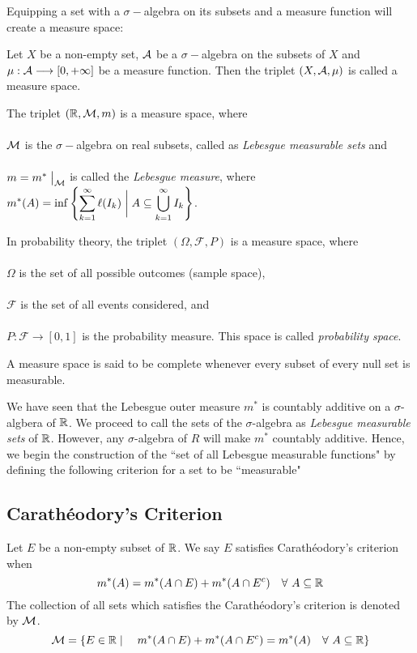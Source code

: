 \documentclass[a4paper]{book}
\begin{document}
\noindent Equipping a set with a $\sigma-$algebra on its subsets and a measure function will create a measure space:
\begin{definition}
Let $X$ be a non-empty set, $\mathcal{A}$ be a $\sigma-$algebra on the subsets of $X$ and $\mu: \mathcal{A} \longrightarrow [0, +\infty]$ be a measure function. Then the triplet $(X, \mathcal{A}, \mu)$ is called a measure space.
\end{definition}
\begin{exampleT}
The triplet $(\mathbb{R}, \mathcal{M}, m)$ is a measure space, where \\\\$\mathcal{M}$ is the $\sigma-$algebra on real subsets, called as {\em Lebesgue measurable sets} and\\\\ $m = m^*\bigm|_{\mathcal{M}}$ is called the {\em Lebesgue measure}, where $\displaystyle m^*(A) = \inf \qty{\sum_{k=1}^\infty \ell(I_k)\biggm| A \subseteq \bigcup_{k=1}^{\infty} I_k}$.
\end{exampleT}
\begin{exampleT}
In probability theory, the triplet $(\Omega, \mathcal{F}, P)$ is a measure space, where \\\\ $\Omega$ is the set of all possible outcomes (sample space), \\\\ $\mathcal{F}$ is the set of all events considered, and\\\\$P:\mathcal{F} \longrightarrow [0,1]$ is the probability measure. This space is called {\em probability space}.
\end{exampleT}
\begin{definition}
A measure space is said to be complete whenever every subset of every null set is measurable.
\end{definition}
We have seen that the Lebesgue outer measure $m^*$ is countably additive on a $\sigma$-algbera of $\mathbb{R}$. We proceed to call the sets of the $\sigma$-algebra as {\em Lebesgue measurable sets} of $\mathbb{R}$. However, any $\sigma$-algebra of $R$ will make $m^*$ countably additive. Hence, we begin the construction of the ``set of all Lebesgue measurable functions" by defining the following criterion for a set to be ``measurable"
\subsection{Carath\'eodory's Criterion}
\begin{definition}
Let $E$ be a non-empty subset of $\mathbb{R}$. We say $E$ satisfies Carath\'eodory's criterion when 
\[ m^*(A) = m^*(A \cap E) + m^*(A \cap E^c)\quad \forall\ A \subseteq \mathbb{R} \]
The collection of all sets which satisfies the Carath\'eodory's criterion is denoted by $\mathcal{M}$. 
\[ \mathcal{M} = \qty{E \in \mathbb{R}\mid \quad m^*(A \cap E) + m^*(A \cap E^c) = m^*(A) \quad \forall\ A \subseteq \mathbb{R}} \]
\end{definition}
\end{document}
